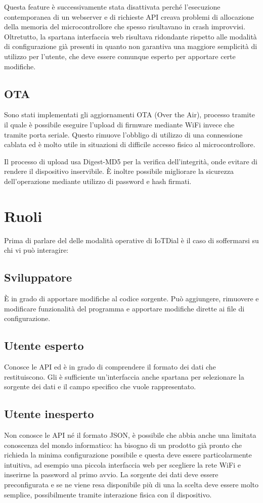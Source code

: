 \documentclass[12pt,a4paper]{report}
\begin{document}
Questa feature è successivamente stata disattivata perché l'esecuzione contemporanea di un webserver e di richieste API creava
problemi di allocazione della memoria del microcontrollore che spesso risultavano in crash improvvisi. Oltretutto, la spartana
interfaccia web risultava ridondante rispetto alle modalità di configurazione già presenti in quanto non garantiva una maggiore
semplicità di utilizzo per l'utente, che deve essere comunque esperto per apportare certe modifiche.

\subsection{OTA}
Sono stati implementati gli aggiornamenti OTA (Over the Air), processo tramite il quale è possibile eseguire l'upload di firmware
mediante WiFi invece che tramite porta seriale. Questo rimuove l'obbligo di utilizzo di una connessione cablata ed è molto utile
in situazioni di difficile accesso fisico al microcontrollore.

Il processo di upload usa Digest-MD5 per la verifica dell'integrità, onde evitare di rendere il dispositivo inservibile. È inoltre possibile
migliorare la sicurezza dell'operazione mediante utilizzo di password e hash firmati. \cite{espota}

\section{Ruoli}
Prima di parlare del delle modalità operative di IoTDial è il caso di soffermarsi su chi vi può interagire:
\subsection*{Sviluppatore}
È in grado di apportare modifiche al codice sorgente. Può aggiungere, rimuovere e  modificare funzionalità del programma
e apportare modifiche dirette ai file di configurazione.
\subsection*{Utente esperto}
Conosce le API ed è in grado di comprendere il formato dei dati che restituiscono. Gli è sufficiente un'interfaccia anche spartana
per selezionare la sorgente dei dati e il campo specifico che vuole rappresentato.
\subsection*{Utente inesperto}
Non conosce le API né il formato JSON, è possibile che abbia anche una limitata conoscenza del mondo informatico:
ha bisogno di un prodotto già pronto che richieda la minima configurazione possibile e questa
deve essere particolarmente intuitiva, ad esempio una piccola interfaccia web per scegliere la rete WiFi e inserirne la password
al primo avvio. La sorgente dei dati deve essere preconfigurata e se ne viene resa disponibile più di una la scelta deve essere molto
semplice, possibilmente tramite interazione fisica con il dispositivo.
\end{document}
